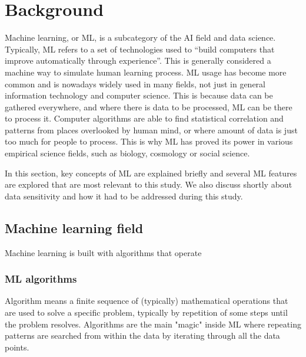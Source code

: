 
\section{Background}\label{sec:background}

Machine learning, or ML,
is a subcategory of the AI field and data science.
Typically, ML refers to
a set of technologies used to \enquote{build computers
that improve automatically through experience}.\cite{jordan2015machine}
This is generally considered a machine way
to simulate human learning process.
ML usage has become more common
and is nowadays widely used in many fields,
not just in general information technology and computer science.
This is because data can be gathered everywhere,
and where there is data to be processed,
ML can be there to process it.
Computer algorithms are able to find 
statistical correlation and patterns
from places overlooked by human mind,
or where amount of data is just too much 
for people to process.
This is why ML has proved its power
in various empirical science fields,
such as biology, cosmology or social science.\cite{jordan2015machine}

In this section, 
key concepts of ML are explained briefly
and several ML features are explored 
that are most relevant to this study.
We also discuss shortly about data sensitivity
and how it had to be addressed during this study.



\subsection{Machine learning field}\label{subsec:bg-ml-field}

Machine learning is built with algorithms
that operate

\subsubsection*{ML algorithms}
Algorithm means a finite sequence of (typically) mathematical operations
that are used to solve a specific problem, 
typically by repetition of some steps
until the problem resolves.\cite{merriam2022algorithm}
Algorithms are the main "magic" inside ML
where repeating patterns are searched from within the data
by iterating through all the data points.

